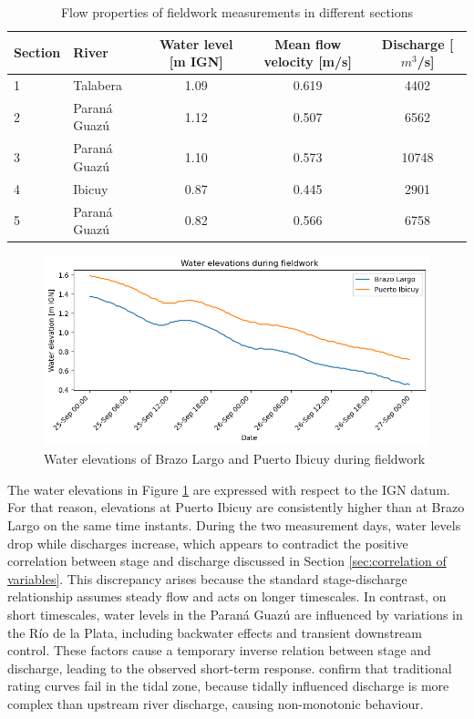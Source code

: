 \begin{table}[H]
    \centering
    \renewcommand{\arraystretch}{1.2} %
    \setlength{\tabcolsep}{8pt}       %
    \caption{Flow properties of fieldwork measurements in different sections}
    \begin{tabular}{llccc}
        \toprule
        \textbf{Section} & \textbf{River} & \textbf{Water level [m IGN]} & \textbf{Mean flow velocity [m/s]} & \textbf{Discharge [$m^3$/s]} \\
        \midrule
        1 & Talabera       & 1.09 & 0.619 & 4402 \\
        2 & Paraná Guazú   & 1.12 & 0.507 & 6562 \\
        3 & Paraná Guazú   & 1.10 & 0.573 & 10748 \\
        \midrule
        4 & Ibicuy & 0.87 & 0.445 & 2901 \\
        5 & Paraná Guazú   & 0.82 & 0.566 & 6758 \\
        \bottomrule
    \end{tabular}
    \label{tab:discharges fieldwork}
\end{table}

\begin{figure}
    \centering
    \includegraphics[width=0.75\linewidth]{figures/ch6/water elevations fieldwork.png}
    \caption{Water elevations of Brazo Largo and Puerto Ibicuy during fieldwork}
    \label{fig:water elevations fieldwork}
\end{figure}

The water elevations in Figure \ref{fig:water elevations fieldwork} are expressed with respect to the IGN datum. For that reason, elevations at Puerto Ibicuy are consistently higher than at Brazo Largo on the same time instants. During the two measurement days, water levels drop while discharges increase, which appears to contradict the positive correlation between stage and discharge discussed in Section \ref{sec:correlation of variables}. This discrepancy arises because the standard stage-discharge relationship assumes steady flow and acts on longer timescales. In contrast, on short timescales, water levels in the Paraná Guazú are influenced by variations in the Río de la Plata, including backwater effects and transient downstream control. These factors cause a temporary inverse relation between stage and discharge, leading to the observed short-term response. \citeauthor{jonesExpandedRatingCurve2019} confirm that traditional rating curves fail in the tidal zone, because tidally influenced discharge is more complex than upstream river discharge, causing non-monotonic behaviour. 




